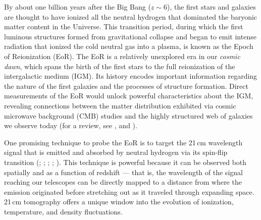 \documentclass[preprint2,numberedappendix,tighten]{aastex6}
\begin{document}
By about one billion years after the Big Bang ($z \sim 6$), the first stars and galaxies are thought to have ionized all the 
neutral hydrogen that dominated the baryonic matter content in the Universe. This transition period, during which the first 
luminous structures formed from gravitational collapse and began to emit intense radiation that ionized the cold neutral gas 
into a plasma, is known as the Epoch of Reionization (EoR). The EoR is a relatively unexplored era in our \textit{cosmic dawn}, which spans the birth of the first stars to the full reionization of the intergalactic medium (IGM). Its 
history encodes important information regarding the nature of the first galaxies and the processes of structure formation. 
Direct measurements of the EoR would unlock powerful characteristics about the IGM, revealing connections 
between the matter distribution exhibited via cosmic microwave background (CMB) studies and the highly structured 
web of galaxies we observe today (for a review, see \citet{barkana_and_loeb2001}, \citet{furlanetto_et_al2006} and \citet{loeb_furlanetto_2013}).

One promising technique to probe the EoR is to target the 21\,cm wavelength signal that is emitted and absorbed by neutral hydrogen via 
its spin-flip transition (\citealt{furlanetto_et_al2006}; \citealt{barkana_and_loeb2008}; \citealt{morales_and_wyithe2010}; \citealt{pritchard_and_loeb2010}; \citealt{pritchard_loeb2012}). This technique is powerful because it can be observed both spatially and as a function of redshift --- that is, the wavelength 
of the signal reaching our telescopes can be directly mapped to a distance from where the emission originated before 
stretching out as it traveled through expanding space. 21\,cm tomography offers a unique window into the 
evolution of ionization, temperature, and density fluctuations.
\end{document}
